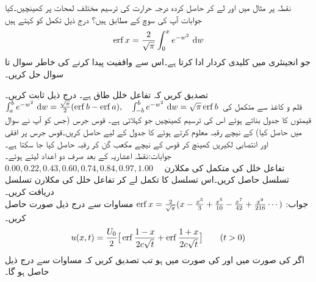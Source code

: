 \quad
نقطہ  پر مثال  میں  اور  لے کر حاصل کردہ درجہ حرارت  کی ترسیم مختلف لمحات پر  کھینچیں۔کیا جوابات آپ کی سوچ کے مطابق ہیں؟
 درج ذیل تکمل کو کہتے ہیں
\begin{align*}
\erf x =\frac{2}{\sqrt{\pi}}\int_0^x e^{-w^2}\,\dif w
\end{align*} 
جو انجینئری میں کلیدی کردار ادا کرتا ہے۔اس سے واقفیت  پیدا کرنے کی خاطر سوال  تا سوال  حل کریں۔

\quad 
تصدیق کریں کہ تفاعل خلل طاق ہے۔
\quad درج ذیل ثابت کریں۔\\
 $\int_a^be^{-w^2}\,\dif w=\frac{\sqrt{\pi}}{2}(\erf b-\erf a),\quad \int_{-b}^be^{-w^2}\,\dif w=\sqrt{\pi}\erf b$
\quad
قلم و کاغذ سے متکمل  کی قیمتوں کا جدول بناتے ہوئے اس کی ترسیم کھینچیں جو  کہلاتی ہے۔  
\quad
قوس جرس (جس کو آپ نے سوال  میں حاصل کیا) کے نیچے رقبہ معلوم کرتے ہوئے  کا جدول  کے لیے حاصل کریں۔قوس جرس پر افقی اور انتصابی لکیریں کھینچ کر قوس کے نیچے مکعب گن کر رقبہ حاصل کیا جا سکتا ہے۔\\
جوابات:\quad نقطہ اعشاریہ کے بعد صرف دو اعداد لیتے ہوئے۔\\
$0.00, 0.22, 0.43, 0.60, 0.74, 0.84,0.97,1.00\quad $
\quad تفاعل خلل کی متکمل  کی مکلارن تسلسل حاصل کریں۔اس تسلسل کا تکمل لے کر تفاعل خلل  کی مکلارن تسلسل دریافت کریں۔\\
جواب:\quad
$\operatorname{erf} x=\tfrac{2}{\sqrt{\pi}}(x-\tfrac{x^3}{3}+\tfrac{x^5}{10}-\tfrac{x^7}{42}+\tfrac{x^9}{216}\cdots)$
\quad 
مساوات  سے درج ذیل صورت  حاصل کریں۔
\begin{align*}
u(x,t)=\frac{U_0}{2}\big[\operatorname{erf} \frac{1-x}{2c\sqrt{t}}+\operatorname{erf} \frac{1+x}{2c\sqrt{t}}\big]\quad \quad (t>0)
\end{align*}
\quad اگر  کی صورت میں  اور  کی صورت میں  ہو تب تصدیق کریں کہ مساوات  سے درج ذیل حاصل ہو گا۔
